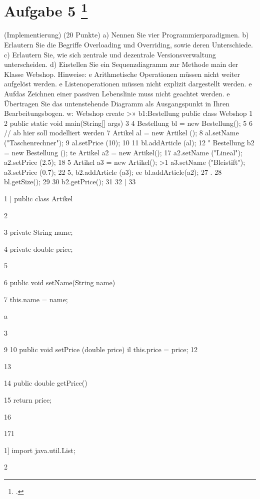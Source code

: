 \documentclass{lehramt-informatik-aufgabe}
\begin{document}
\liAufgabenTitel{}
\section{Aufgabe 5
\footcite{66116:2021:03}}

 (Implementierung) (20 Punkte)
a) Nennen Sie vier Programmierparadigmen.
b) Erlautern Sie die Begriffe Overloading und Overriding, sowie deren Unterschiede.
c)  Erlautern Sie, wie sich zentrale und dezentrale Versionsverwaltung unterscheiden.
d)  Eiıstellen Sie ein Sequenzdiagramm zur Methode main der Klasse Webshop.
Hinweise:
e Arithmetische Operationen müssen nicht weiter aufgelöst werden.
e Listenoperationen müssen nicht explizit dargestellt werden.
e Aufdas Zeichnen einer passiven Lebenslinie muss nicht geachtet werden.
e Übertragen Sie das untenstehende Diagramm als Ausgangspunkt in Ihren Bearbeitungsbogen.
w: Webshop
create
>» b1:Bestellung
public class Webshop {
1
2 public static void main(String[] args) {
3
4 Bestellung bl = new Bestellung();
5
6 // ab hier soll modelliert werden
7 Artikel al = new Artikel ();
8 al.setName ("Taschenrechner");
9 al.setPrice (10);
10
11 bl.addArticle (al);
12
" Bestellung b2 = new Bestellung ();
te Artikel a2 = new Artikel();
17 a2.setName ("Lineal");
a2.setPrice (2.5);
18
5 Artikel a3 = new Artikel();
>1 a3.setName ("Bleistift");
a3.setPrice (0.7);
22
5, b2.addArticle (a3);
ee bl.addArticle(a2);
27 .
28 bl.getSize();
29
30 b2.getPrice();
31 }
32 |}
33

1 | public class Artikel {

2

3 private String name;

4 private double price;

5

6 public void setName(String name) {

7 this.name = name;

a} 3

9
10 public void setPrice (double price) {
il this.price = price;
12 }

13

14 public double getPrice() {

15 return price;

16 }

171}

1] import java.util.List;

2
\end{document}
